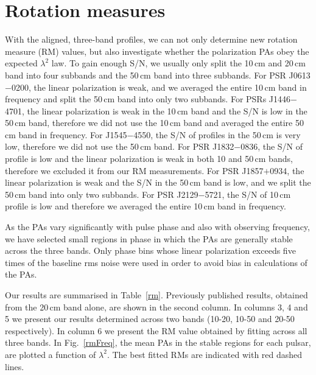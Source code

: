 \documentclass[useAMS,usenatbib]{mn2e}
\begin{document}
\section{Rotation measures}


With the aligned, three-band profiles, we can not only determine new rotation 
measure (RM) values, but also investigate whether the polarization PAs obey the 
expected $\lambda^2$ law.
%
To gain enough S/N, we usually only split the 10\,cm and 20\,cm band into four subbands 
and the 50\,cm band into three subbands. For PSR J0613$-$0200, the linear polarization is 
weak, and we averaged the entire 10\,cm band in frequency and split the 50\,cm band into only 
two subbands. For PSRs J1446$-$4701, the linear polarization is weak in the 10\,cm 
band and the S/N is low in the 50\,cm band, therefore we did not use the 10\,cm band 
and averaged the entire 50\,cm band in frequency. For J1545$-$4550, the S/N of profiles 
in the 50\,cm is very low, therefore we did not use the 50\,cm band. For PSR J1832$-$0836, 
the S/N of profile is low and the linear polarization is weak in both 10 and 50\,cm bands, 
therefore we excluded it from our RM measurements. For PSR J1857$+$0934, 
the linear polarization is weak and the S/N in the 50\,cm band is low, and we 
split the 50\,cm band into only two subbands. For PSR J2129$-$5721, 
the S/N of 10\,cm profile is low and therefore we averaged the entire 10\,cm band 
in frequency. 
%

As the PAs vary significantly with pulse phase and also with observing frequency, 
we have selected small regions in phase in which the PAs are generally stable across 
the three bands. Only phase bins whose linear polarization exceeds five times of 
the baseline rms noise were used in order to avoid bias in calculations of the PAs.
%

Our results are summarised in Table~\ref{rm}. Previously published results, obtained 
from the 20\,cm band alone, are shown in the second column. In columns 3, 4 and 5 we 
present our results determined across two bands (10-20, 10-50 and 20-50 respectively).  
In column 6 we present the RM value obtained by fitting across all three bands.  
In Fig.~\ref{rmFreq}, the mean PAs in the stable regions for each pulsar, are plotted 
a function of $\lambda^2$. The best fitted RMs are indicated with red dashed lines. 
\end{document}

